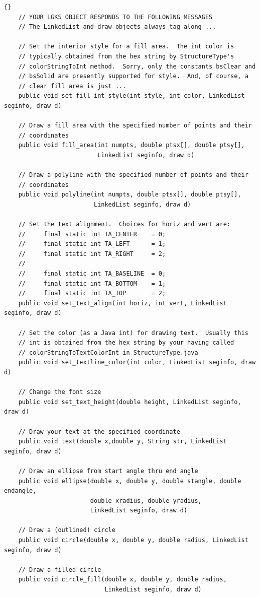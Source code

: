 \documentclass[12pt]{article}
\begin{document}
\begin{lstlisting}{}
    // YOUR LGKS OBJECT RESPONDS TO THE FOLLOWING MESSAGES
    // The LinkedList and draw objects always tag along ...
   
    // Set the interior style for a fill area.  The int color is
    // typically obtained from the hex string by StructureType's
    // colorStringToInt method.  Sorry, only the constants bsClear and
    // bsSolid are presently supported for style.  And, of course, a
    // clear fill area is just ...
    public void set_fill_int_style(int style, int color, LinkedList seginfo, draw d) 

    // Draw a fill area with the specified number of points and their
    // coordinates
    public void fill_area(int numpts, double ptsx[], double ptsy[], 
                          LinkedList seginfo, draw d) 
    
    // Draw a polyline with the specified number of points and their
    // coordinates
    public void polyline(int numpts, double ptsx[], double ptsy[], 
                         LinkedList seginfo, draw d) 
    
    // Set the text alignment.  Choices for horiz and vert are:
    //     final static int TA_CENTER    = 0;   
    //     final static int TA_LEFT      = 1;
    //     final static int TA_RIGHT     = 2;
    // 
    //     final static int TA_BASELINE  = 0;
    //     final static int TA_BOTTOM    = 1;
    //     final static int TA_TOP       = 2;  
    public void set_text_align(int horiz, int vert, LinkedList seginfo, draw d) 

    // Set the color (as a Java int) for drawing text.  Usually this
    // int is obtained from the hex string by your having called
    // colorStringToTextColorInt in StructureType.java
    public void set_textline_color(int color, LinkedList seginfo, draw d) 

    // Change the font size
    public void set_text_height(double height, LinkedList seginfo, draw d) 
    
    // Draw your text at the specified coordinate
    public void text(double x,double y, String str, LinkedList seginfo, draw d) 
   
    // Draw an ellipse from start angle thru end angle
    public void ellipse(double x, double y, double stangle, double endangle, 
                        double xradius, double yradius,
                        LinkedList seginfo, draw d) 
 
    // Draw a (outlined) circle
    public void circle(double x, double y, double radius, LinkedList seginfo, draw d) 
    
    // Draw a filled circle
    public void circle_fill(double x, double y, double radius, 
                            LinkedList seginfo, draw d) 
\end{lstlisting}
\end{document}
